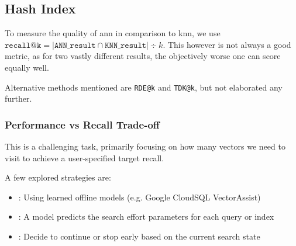 \subsection{Hash Index}
To measure the quality of \acrshort{ann} in comparison to \acrshort{knn}, we use $\texttt{recall@k} = |\texttt{ANN\_result} \cap \texttt{KNN\_result}| \div k$.
This however is not always a good metric, as for two vastly different results, the objectively worse one can score equally well.

Alternative methods mentioned are \texttt{RDE@k} and \texttt{TDK@k}, but not elaborated any further.


\subsubsection{Performance vs Recall Trade-off}
This is a challenging task, primarily focusing on how many vectors we need to visit to achieve a user-specified target recall.

A few explored strategies are:
\begin{itemize}
    \item {}: Using learned offline models (e.g. Google CloudSQL VectorAssist)
    \item {}: A model predicts the search effort parameters for each query or index
    \item {}: Decide to continue or stop early based on the current search state
\end{itemize}
